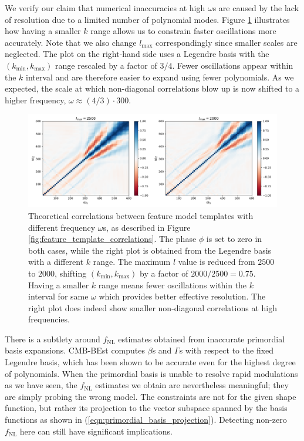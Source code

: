 We verify our claim that numerical inaccuracies at high $\omega$s are caused by the lack of resolution due to a limited number of polynomial modes. Figure \ref{fig:feature_template_correlations_compare_lmax} illustrates how having a smaller $k$ range allows us to constrain faster oscillations more accurately. Note that we also change $l_\text{max}$ correspondingly since smaller scales are neglected. The plot on the right-hand side uses a Legendre basis with the $(k_\text{min}, k_\text{max})$ range rescaled by a factor of $3/4$. Fewer oscillations appear within the $k$ interval and are therefore easier to expand using fewer polynomials. As we expected, the scale at which non-diagonal correlations blow up is now shifted to a higher frequency, $\omega \approx (4/3) \cdot 300$. 

\begin{figure}[htbp!] 
	\centering    
	\includegraphics[width=\textwidth]{sine_template_correlations_compare_lmax_new.pdf}
	\caption{Theoretical correlations between feature model templates with different frequency $\omega$s, as described in Figure \ref{fig:feature_template_correlations}. The phase $\phi$ is set to zero in both cases, while the right plot is obtained from the Legendre basis with a different $k$ range. The maximum $l$ value is reduced from $2500$ to $2000$, shifting $(k_\text{min},k_\text{max})$ by a factor of $2000/2500 = 0.75$. Having a smaller $k$ range means fewer oscillations within the $k$ interval for same $\omega$ which provides better effective resolution. The right plot does indeed show smaller non-diagonal correlations at high frequencies.}
	\label{fig:feature_template_correlations_compare_lmax}
\end{figure}

There is a subtlety around $f_\text{NL}$ estimates obtained from inaccurate primordial basis expansions. CMB-BEst computes $\beta$s and $\Gamma$s with respect to the fixed Legendre basis, which has been shown to be accurate even for the highest degree of polynomials. When the primordial basis is unable to resolve rapid modulations as we have seen, the $f_\text{NL}$ estimates we obtain are nevertheless meaningful; they are simply probing the wrong model. The constraints are not for the given shape function, but rather its projection to the vector subspace spanned by the basis functions as shown in (\ref{eqn:primordial_basis_projection}). Detecting non-zero $f_\text{NL}$ here can still have significant implications.

